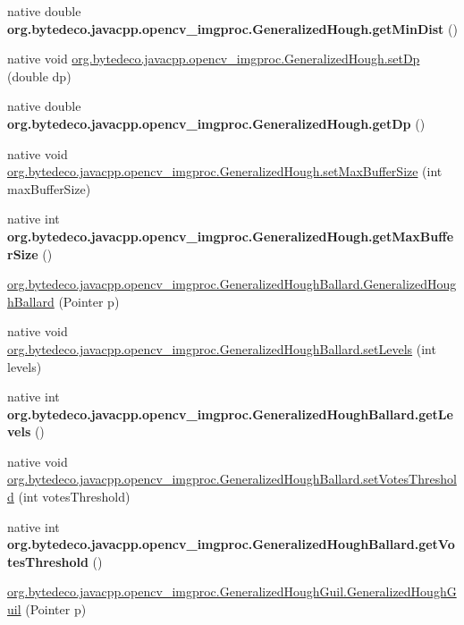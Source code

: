 \begin{DoxyCompactItemize}
native double {\bfseries org.\+bytedeco.\+javacpp.\+opencv\+\_\+imgproc.\+Generalized\+Hough.\+get\+Min\+Dist} ()
\item 
native void \hyperlink{group__imgproc_ga08c264185f923eab1e7b28a97c8a99ae}{org.\+bytedeco.\+javacpp.\+opencv\+\_\+imgproc.\+Generalized\+Hough.\+set\+Dp} (double dp)
\item 
\mbox{\label{group__imgproc_gad336797438d098ffe50eaac1e40f01a3}} 
native double {\bfseries org.\+bytedeco.\+javacpp.\+opencv\+\_\+imgproc.\+Generalized\+Hough.\+get\+Dp} ()
\item 
native void \hyperlink{group__imgproc_gaad80aee63ad33db9cbf990de857c2794}{org.\+bytedeco.\+javacpp.\+opencv\+\_\+imgproc.\+Generalized\+Hough.\+set\+Max\+Buffer\+Size} (int max\+Buffer\+Size)
\item 
\mbox{\label{group__imgproc_ga3a7aa9225ecd17c709e564a515334ec2}} 
native int {\bfseries org.\+bytedeco.\+javacpp.\+opencv\+\_\+imgproc.\+Generalized\+Hough.\+get\+Max\+Buffer\+Size} ()
\item 
\hyperlink{group__imgproc_ga89c305064b6777998f61c86e5929aee5}{org.\+bytedeco.\+javacpp.\+opencv\+\_\+imgproc.\+Generalized\+Hough\+Ballard.\+Generalized\+Hough\+Ballard} (Pointer p)
\item 
native void \hyperlink{group__imgproc_ga08916f9b4499b2356dd542266564dec0}{org.\+bytedeco.\+javacpp.\+opencv\+\_\+imgproc.\+Generalized\+Hough\+Ballard.\+set\+Levels} (int levels)
\item 
\mbox{\label{group__imgproc_gaebebc237a19df864a5b82fd4fc2a1527}} 
native int {\bfseries org.\+bytedeco.\+javacpp.\+opencv\+\_\+imgproc.\+Generalized\+Hough\+Ballard.\+get\+Levels} ()
\item 
native void \hyperlink{group__imgproc_ga25a1e73a7d5ff7fe78971cb34fd6706c}{org.\+bytedeco.\+javacpp.\+opencv\+\_\+imgproc.\+Generalized\+Hough\+Ballard.\+set\+Votes\+Threshold} (int votes\+Threshold)
\item 
\mbox{\label{group__imgproc_gac53696fad5c3434ffc57f8c70dd872e8}} 
native int {\bfseries org.\+bytedeco.\+javacpp.\+opencv\+\_\+imgproc.\+Generalized\+Hough\+Ballard.\+get\+Votes\+Threshold} ()
\item 
\hyperlink{group__imgproc_ga357e428632b56d7aa6e17ea2b77713f5}{org.\+bytedeco.\+javacpp.\+opencv\+\_\+imgproc.\+Generalized\+Hough\+Guil.\+Generalized\+Hough\+Guil} (Pointer p)

\end{DoxyCompactItemize}
